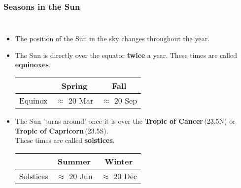 \begin{frame}
\frametitle{Seasons in the Sun}
\begin{columns}
\begin{itemize}\small
	\item The position of the Sun in the sky changes throughout the year.
	
	
	\item The Sun is directly over the equator \textbf{twice} a year. These times are called \textbf{equinoxes}.
	\begin{center}\scriptsize
		\begin{tabular}{ccc}
			& Spring           & Fall             \\ 
			\toprule
			Equinox & $\approx$ 20 Mar & $\approx$ 20 Sep 
		\end{tabular}
	\end{center}
	
	\item The Sun 'turns around' once it is over the \textbf{Tropic of Cancer}\,(23.5\degree N) or \textbf{Tropic of Capricorn}\,(23.5\degree S).\\ These times are called \textbf{solstices}.
	\begin{center}\scriptsize
		\begin{tabular}{ccc}
			& Summer           & Winter             \\ 
			\toprule
			Solstices & $\approx$ 20 Jun & $\approx$ 20 Dec 
		\end{tabular}
	\end{center}
\end{itemize}
\end{columns}
\end{frame}

